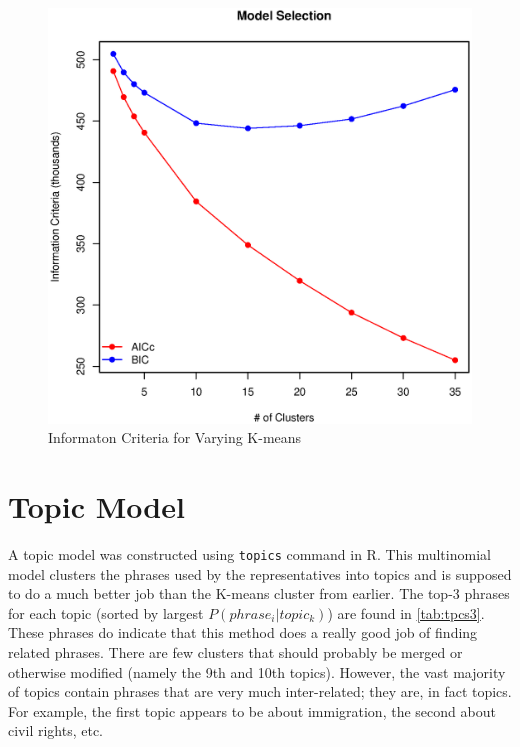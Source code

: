 \documentclass[11pt, fleqn]{article}
\begin{document}
\begin{figure}[!htb]
  \centering
  \includegraphics[scale=.5]{kmeans_ic_plot.eps}
  \caption{Informaton Criteria for Varying K-means}
  \label{fig:kmeans_ic_plot}
\end{figure}



\section{Topic Model}

A topic model was constructed using \texttt{topics} command in R.  This multinomial model clusters the phrases used by the representatives into topics and is supposed to do a much better job than the K-means cluster from earlier.  The top-3 phrases for each topic (sorted by largest $P(phrase_i|topic_k)$) are found in \vref{tab:tpcs3}.  These phrases do indicate that this method does a really good job of finding related phrases.  There are few clusters that should probably be merged or otherwise modified (namely the 9th and 10th topics).  However, the vast majority of topics contain phrases that are very much inter-related; they are, in fact topics.  For example, the first topic appears to be about immigration, the second about civil rights, etc.


\end{document}
